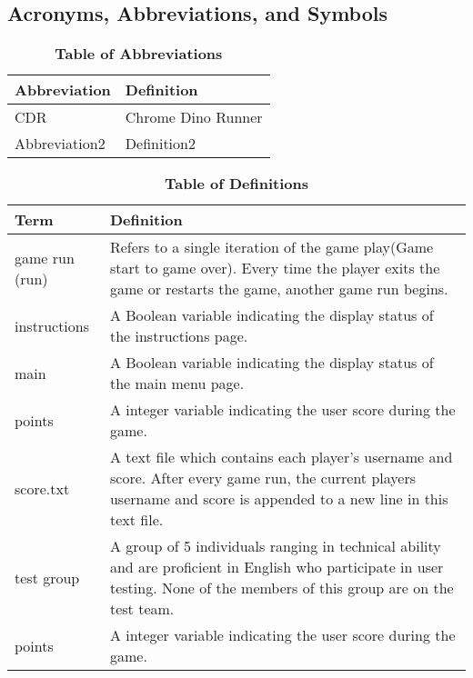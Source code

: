 \documentclass[12pt, titlepage]{article}
\begin{document}
	
	\subsection{Acronyms, Abbreviations, and Symbols}
	
	\begin{table}[hbp]
		\caption{\textbf{Table of Abbreviations}} \label{Table}
		
		\begin{tabularx}{\textwidth}{p{3cm}X}
			\toprule
			\textbf{Abbreviation} & \textbf{Definition} \\
			\midrule
			CDR & Chrome Dino Runner\\
			Abbreviation2 & Definition2\\
			\bottomrule
		\end{tabularx}
		
	\end{table}
	
	
	\begin{table}[!htbp]
		\caption{\textbf{Table of Definitions}} \label{Table}
		
		\begin{tabularx}{\textwidth}{p{3cm}X}
			\toprule
			\textbf{Term} & \textbf{Definition}\\
			\midrule
			game run (run) & Refers to a single iteration of the game play(Game start to game over). Every time the player exits the game or restarts the game, another game run begins.\\
			
			instructions & A Boolean variable indicating the display status of the instructions page.\\
			
			main & A Boolean variable indicating the display status of the main menu page. \\
			
			points & A integer variable indicating the user score during the game. \\
			
			score.txt & A text file which contains each player's username and score. After every game run, the current players username and score is appended to a new line in this text file.\\
			
			test group & A group of 5 individuals ranging in technical ability and are proficient in English who participate in user testing. None of the members of this group are on the test team.  \\
			
			points & A integer variable indicating the user score during the game. \\
			\bottomrule
		\end{tabularx}
		
	\end{table}	
	
\end{document}
